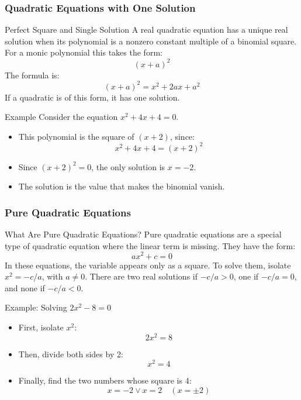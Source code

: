 \documentclass[10pt]{beamer}
\begin{document}
	\begin{frame}
		\frametitle{Quadratic Equations with One Solution}
		\fontsize{9}{11}
		
		\begin{block}{Perfect Square and Single Solution}
			A real quadratic equation has a unique real solution when its polynomial is a nonzero constant multiple of a binomial square. For a monic polynomial this takes the form:
			\[
			(x + a)^2
			\]
			The formula is:
			\[
			(x + a)^2 = x^2 + 2ax + a^2
			\]
			If a quadratic is of this form, it has one solution.
		\end{block}
		
		\begin{block}{Example}
			Consider the equation \(x^2 + 4x + 4 = 0\).
			\begin{itemize}
				\item This polynomial is the square of \((x + 2)\), since:
				\[
				x^2 + 4x + 4 = (x + 2)^2
				\]
				\item Since \((x + 2)^2 = 0\), the only solution is \(x = -2\).
				\item The solution is the value that makes the binomial vanish.
			\end{itemize}
		\end{block}
	\end{frame}
	\begin{frame}
		\fontsize{8.5}{11}
		\frametitle{Pure Quadratic Equations}
		
		\begin{block}{What Are Pure Quadratic Equations?}
			Pure quadratic equations are a special type of quadratic equation where the linear term is missing. They have the form:
			\[
			ax^2 + c = 0
			\]
			In these equations, the variable appears only as a square. To solve them, isolate \(x^2=-c/a\), with \(a\ne0\). There are two real solutions if \(-c/a>0\), one if \(-c/a=0\), and none if \(-c/a<0\).
		\end{block}
		
		\setbeamercolor{block body}{fg=black, bg=green!20}
		\begin{block}{Example: Solving \(2x^2 - 8 = 0\)}
			\begin{itemize}
				\item First, isolate \(x^2\): \[2x^2 = 8\]
				\item Then, divide both sides by 2: \[x^2 = 4\]
				\item Finally, find the two numbers whose square is 4: \[x = -2 \vee x = 2 \quad (x = \pm 2)\]
			\end{itemize}
		\end{block}
	\end{frame}
	
\end{document}

